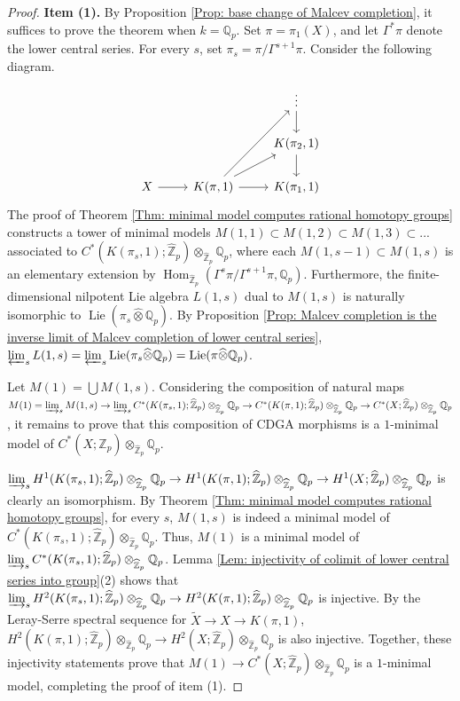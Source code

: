 \documentclass[11pt]{amsart}
\theoremstyle{definition}
\numberwithin{equation}{section}
\numberwithin{equation}{section}
\newcommand\QQ{\mathbb{Q}}
\newcommand\ZZ{\mathbb{Z}}
\DeclareMathOperator{\homo}{Hom}
\DeclareMathOperator{\Lie}{Lie}
\begin{document}
\begin{proof}


\textbf{Item (1). } By Proposition \ref{Prop: base change of Malcev completion}, it suffices to prove the theorem when $k=\QQ_p$. Set $\pi=\pi_1(X)$, and let $\Gamma^*\pi$ denote the lower central series. For every $s$, set $\pi_s=\pi/\Gamma^{s+1}\pi$. Consider the following diagram.
\[
\begin{tikzcd}
    & & \vdots \arrow[d] \\
    & & K(\pi_2,1) \arrow[d] \\
    X \arrow[r] & K(\pi,1) \arrow[ruu] \arrow[ru] \arrow[r] & K(\pi_1,1)
\end{tikzcd}
\]
The proof of Theorem \ref{Thm: minimal model computes rational homotopy groups} constructs a tower of minimal models $M(1,1)\subset M(1,2)\subset M(1,3)\subset ...$ associated to $C^*(K(\pi_s,1);\widehat{\ZZ}_p)\otimes_{\widehat{\ZZ}_p} \QQ_p$, where each $M(1,s-1)\subset M(1,s)$ is an elementary extension by $\homo_{\widehat{\ZZ}_p}(\Gamma^{s}\pi/\Gamma^{s+1}\pi,\QQ_p)$. Furthermore, the finite-dimensional nilpotent Lie algebra $L(1,s)$ dual to $M(1,s)$ is naturally isomorphic to $\Lie(\pi_s\widehat{\otimes}\QQ_p)$. By Proposition \ref{Prop: Malcev completion is the inverse limit of Malcev completion of lower central series}, $\varprojlim_sL(1,s)=\varprojlim_s\Lie(\pi_{s}\widehat{\otimes}\QQ_p)=\Lie(\pi\widehat{\otimes}\QQ_p)$.

Let $M(1)=\bigcup M(1,s)$. Considering the composition of natural maps $M(1)=\varinjlim_sM(1,s)\rightarrow \varinjlim_sC^*(K(\pi_s,1);\widehat{\ZZ}_p)\otimes_{\widehat{\ZZ}_p} \QQ_p\rightarrow C^*(K(\pi,1);\widehat{\ZZ}_p)\otimes_{\widehat{\ZZ}_p} \QQ_p\rightarrow C^*(X;\widehat{\ZZ}_p)\otimes_{\widehat{\ZZ}_p} \QQ_p$, it remains to prove that this composition of CDGA morphisms is a $1$-minimal model of $C^*(X;\widehat{\ZZ}_p)\otimes_{\widehat{\ZZ}_p} \QQ_p$. 

$\varinjlim_s H^1(K(\pi_s,1);\widehat{\ZZ}_p)\otimes_{\widehat{\ZZ}_p} \QQ_p\rightarrow H^1(K(\pi,1);\widehat{\ZZ}_p)\otimes_{\widehat{\ZZ}_p} \QQ_p\rightarrow H^1(X;\widehat{\ZZ}_p)\otimes_{\widehat{\ZZ}_p} \QQ_p$ is clearly an isomorphism. By Theorem \ref{Thm: minimal model computes rational homotopy groups}, for every $s$, $M(1,s)$ is indeed a minimal model of $C^*(K(\pi_s,1);\widehat{\ZZ}_p)\otimes_{\widehat{\ZZ}_p} \QQ_p$. Thus, $M(1)$ is a minimal model of $\varinjlim_sC^*(K(\pi_s,1);\widehat{\ZZ}_p)\otimes_{\widehat{\ZZ}_p} \QQ_p$.
Lemma \ref{Lem: injectivity of colimit of lower central series into group}(2) shows that $\varinjlim_s H^2(K(\pi_s,1);\widehat{\ZZ}_p)\otimes_{\widehat{\ZZ}_p} \QQ_p\rightarrow H^2(K(\pi,1);\widehat{\ZZ}_p)\otimes_{\widehat{\ZZ}_p} \QQ_p$ is injective. By the Leray-Serre spectral sequence for $\widetilde{X}\rightarrow X\rightarrow K(\pi,1)$, $H^2(K(\pi,1);\widehat{\ZZ}_p)\otimes_{\widehat{\ZZ}_p} \QQ_p\rightarrow H^2(X;\widehat{\ZZ}_p)\otimes_{\widehat{\ZZ}_p} \QQ_p$ is also injective. Together, these injectivity statements prove that $M(1)\rightarrow C^*(X;\widehat{\ZZ}_p)\otimes_{\widehat{\ZZ}_p}\QQ_p$ is a $1$-minimal model, completing the proof of item (1).


\end{proof}
\end{document}
